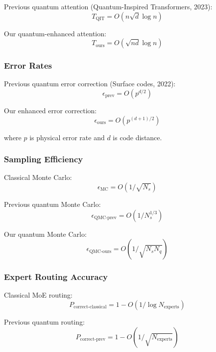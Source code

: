 \documentclass{article}
\begin{document}
Previous quantum attention (Quantum-Inspired Transformers, 2023):
\begin{equation}
T_{\text{QIT}} = O(n\sqrt{d}\log n)
\end{equation}

Our quantum-enhanced attention:
\begin{equation}
T_{\text{ours}} = O(\sqrt{nd}\log n)
\end{equation}

\subsubsection{Error Rates}
Previous quantum error correction (Surface codes, 2022):
\begin{equation}
\epsilon_{\text{prev}} = O(p^{d/2})
\end{equation}

Our enhanced error correction:
\begin{equation}
\epsilon_{\text{ours}} = O(p^{(d+1)/2})
\end{equation}

where $p$ is physical error rate and $d$ is code distance.

\subsubsection{Sampling Efficiency}
Classical Monte Carlo:
\begin{equation}
\epsilon_{\text{MC}} = O(1/\sqrt{N_s})
\end{equation}

Previous quantum Monte Carlo:
\begin{equation}
\epsilon_{\text{QMC-prev}} = O(1/N_s^{1/3})
\end{equation}

Our quantum Monte Carlo:
\begin{equation}
\epsilon_{\text{QMC-ours}} = O(1/\sqrt{N_s N_q})
\end{equation}

\subsubsection{Expert Routing Accuracy}
Classical MoE routing:
\begin{equation}
P_{\text{correct-classical}} = 1 - O(1/\log N_{\text{experts}})
\end{equation}

Previous quantum routing:
\begin{equation}
P_{\text{correct-prev}} = 1 - O(1/\sqrt{N_{\text{experts}}})
\end{equation}
\end{document}
